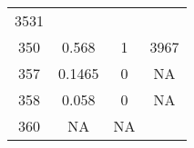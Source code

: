 \documentclass[]{article}
\begin{document}
\begin{longtable}[]{@{}cccc@{}}
\begin{minipage}[t]{0.17\columnwidth}
3531\strut
\end{minipage}\tabularnewline
\begin{minipage}[t]{0.10\columnwidth}\centering\strut
350\strut
\end{minipage} & \begin{minipage}[t]{0.25\columnwidth}\centering\strut
0.568\strut
\end{minipage} & \begin{minipage}[t]{0.17\columnwidth}\centering\strut
1\strut
\end{minipage} & \begin{minipage}[t]{0.17\columnwidth}\centering\strut
3967\strut
\end{minipage}\tabularnewline
\begin{minipage}[t]{0.10\columnwidth}\centering\strut
357\strut
\end{minipage} & \begin{minipage}[t]{0.25\columnwidth}\centering\strut
0.1465\strut
\end{minipage} & \begin{minipage}[t]{0.17\columnwidth}\centering\strut
0\strut
\end{minipage} & \begin{minipage}[t]{0.17\columnwidth}\centering\strut
NA\strut
\end{minipage}\tabularnewline
\begin{minipage}[t]{0.10\columnwidth}\centering\strut
358\strut
\end{minipage} & \begin{minipage}[t]{0.25\columnwidth}\centering\strut
0.058\strut
\end{minipage} & \begin{minipage}[t]{0.17\columnwidth}\centering\strut
0\strut
\end{minipage} & \begin{minipage}[t]{0.17\columnwidth}\centering\strut
NA\strut
\end{minipage}\tabularnewline
\begin{minipage}[t]{0.10\columnwidth}\centering\strut
360\strut
\end{minipage} & \begin{minipage}[t]{0.25\columnwidth}\centering\strut
NA\strut
\end{minipage} & \begin{minipage}[t]{0.17\columnwidth}\centering\strut
NA\strut
\end{minipage} & \begin{minipage}[t]{0.17\columnwidth}\centering\strut

\end{minipage}
\end{longtable}
\end{document}
